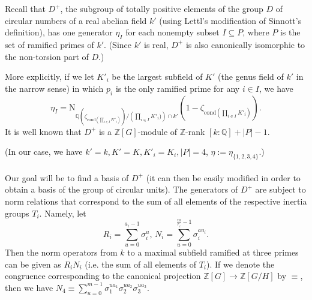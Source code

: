 \documentclass[12pt,a4paper]{article}
\newcommand{\Qbb}{\mathbb{Q}}
\newcommand{\Zbb}{\mathbb{Z}}
\newcommand{\Z}{\mathbb{Z}}
\begin{document}
Recall that $D^+$, the subgroup of totally positive elements of the group $D$ of circular numbers of a real abelian field $k'$ (using Lettl's modification of Sinnott's definition), has one generator $\eta_I$ for each nonempty subset $I\subseteq P$, where $P$ is the set of ramified primes of $k'$. (Since $k'$ is real, $D^+$ is also canonically isomorphic to the non-torsion part of $D$.) 

More explicitly, if we let $K'_i$ be the largest subfield of $K'$ (the genus field of $k'$ in the narrow sense) in which $p_i$ is the only ramified prime for any $i\in I$, we have
$$\eta_I=\text{N}_{\Qbb(\zeta_{\text{cond} \left(\prod_{i\in I}K'_i\right)})/\left(\prod_{i\in I}K'_i)\right)\cap k'}\left(1-\zeta_{\text{cond} \left(\prod_{i\in I}K'_i\right)}\right).$$
It is well known that $D^+$ is a $\Zbb[G]$-module of $\Zbb$-rank $[k:\Qbb]+|P|-1$. 

(In our case, we have $k'=k, K'=K, K'_i=K_i, |P|=4$, $\eta:=\eta_{\{1,2,3,4\}}$.)


\paragraph*{}
Our goal will be to find a basis of $D^+$ (it can then be easily modified in order to obtain a basis of the group of circular units). The generators of $D^+$ are subject to norm relations that correspond to the sum of all elements of the respective inertia groups $T_i$. Namely, let $$R_i=\sum_{u=0}^{a_i-1}\sigma_i^u,\, N_i=\sum_{u=0}^{\frac{m}{r_i}-1}\sigma_i^{au_i}.$$ 
Then the norm operators from $k$ to a maximal subfield ramified at three primes can be given as $R_iN_i$ (i.e. the sum of all elements of $T_i$). If we denote the congruence corresponding to the canonical projection $\Z[G]\to \Z[G/H]$ by $\equiv$, then we have $N_4\equiv \sum_{u=0}^{m-1}\sigma_1^{ua_1}\sigma_2^{ua_2}\sigma_3^{ua_3}$.
\end{document}
